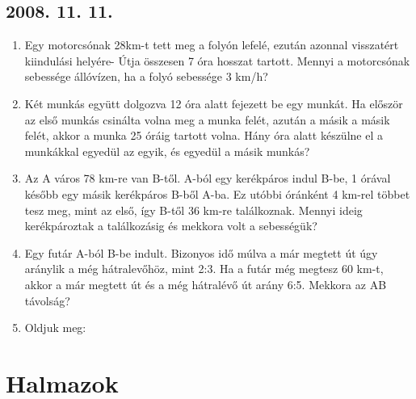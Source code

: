 \subsection*{2008. 11. 11.}
\begin{enumerate}
\item Egy motorcsónak 28km-t tett meg a folyón lefelé, ezután azonnal visszatért kiindulási helyére- Útja összesen 7 óra hosszat tartott. Mennyi a motorcsónak sebessége állóvízen, ha a folyó sebessége 3 km/h?
\item Két munkás együtt dolgozva 12 óra alatt fejezett be egy munkát. Ha először az első munkás csinálta volna meg a munka felét, azután a másik a másik felét, akkor a munka 25 óráig tartott volna. Hány óra alatt készülne el a munkákkal egyedül az egyik, és egyedül a másik munkás?
\item Az A város 78 km-re van B-től. A-ból egy kerékpáros indul B-be, 1 órával később egy másik kerékpáros B-ből A-ba. Ez utóbbi óránként 4 km-rel többet tesz meg, mint az első, így B-től 36 km-re találkoznak. Mennyi ideig kerékpároztak a találkozásig és mekkora volt a sebességük?
\item Egy futár A-ból B-be indult. Bizonyos idő múlva a már megtett út úgy aránylik a még hátralevőhöz, mint 2:3. Ha a futár még megtesz 60 km-t, akkor a már megtett út és a még hátralévő út arány 6:5. Mekkora az AB távolság?
\item Oldjuk meg:
\end{enumerate}


\section{Halmazok}


